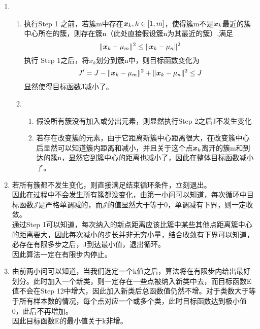 \documentclass[answers]{exam}  %
\begin{document}
\begin{questions}
\begin{solution}
    \begin{enumerate}
		\item \begin{enumerate}
			\item 执行Step 1 之前，若簇m中存在${\boldsymbol{x}}_k ,k\in[1,m]$，使得簇m不是${\boldsymbol{x}}_k$最近的簇中心所在的簇，则存在簇n（此处直接假设簇n为其最近的簇）,满足
			\[
				\|{\boldsymbol{x}}_k-\mu_m\|^2\le \|{\boldsymbol{x}}_k-\mu_n\|^2
			\]
			执行 Step 1之后，将$x_k$划分到簇n中，则目标函数变化为
			\[
				J' = J-\|{\boldsymbol{x}}_k-\mu_m\|^2+\|{\boldsymbol{x}}_k-\mu_n\|^2\le J	
			\]
			显然使得目标函数J减小了。
			\item \begin{enumerate}
				\item 假设所有簇没有加入或分出元素，则显然执行Step 2之后J不发生变化
				\item 若存在改变簇的元素，由于它距离新簇中心距离很大，在改变簇中心后显然可以知道簇内距离和减小，并且关于这个点${\boldsymbol{x}}_{k}$离开的簇m和到达的簇n，显然它到簇中心的距离也减小了，因此在整体目标函数减小了。

			\end{enumerate}
		\end{enumerate}
		\item 若所有簇都不发生变化，则直接满足结束循环条件，立刻退出。\\
		因此在过程中不会发生所有簇都没变化，由第一小问可以知道，每次循环中目标函数$\mathcal J$是严格单调减的，而$\mathcal J$的值显然大于等于0，单调减有下界，则一定收敛。\\
		通过Step 1可以知道，每次纳入的新点距离应该比簇中某些其他点距离簇中心的距离要大，因此每次减小的步长并非无穷小量，结合收敛有下界可以知道，必存在有限多步之后，J到达最小值，退出循环。\\
		因此算法一定在有限步内停止。
		\item 由前两小问可以知道，当我们选定一个k值之后，算法将在有限步内给出最好划分。此时加入一个新类，则一定存在一些点被纳入新类中去，而目标函数E值不会在Step 12中增大，因此加入新类后总函数值仍然不增。对于类数大于等于所有样本数的情况，每个点对应一个或多个类，此时目标函数达到极小值0，此后不再增加。\\
		因此目标函数E的最小值关于k非增。
	\end{enumerate}
\end{solution}

\end{questions}
\end{document}
